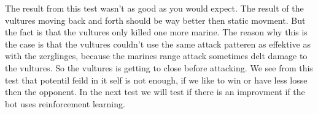 The result from this test wasn't as good as you would expect. The result of the vultures moving back and forth should be way better then static movment.
But the fact is that the vultures only killed one more marine. The reason why this is the case is that the vultures couldn't use the same attack patteren as
effektive as with the zerglinges, because the marines range attack sometimes delt damage to the vultures. So the vultures is getting to close before attacking.
We see from this test that potentil feild in it self is not enough, if we like to win or have less losse then the opponent. In the next test we will test if there is an
improvment if the bot uses reinforcement learning.

